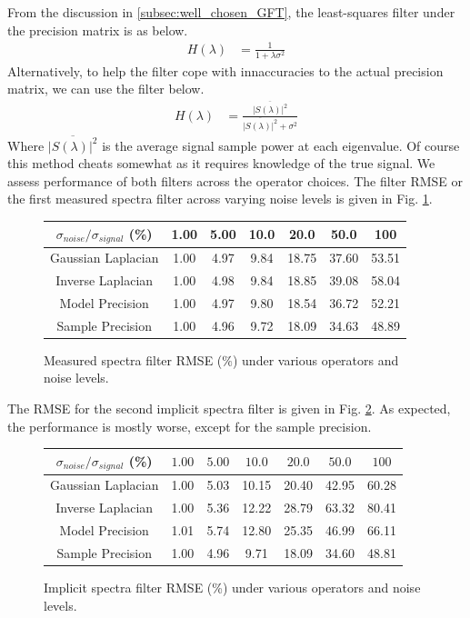 \documentclass[12pt,a4paper]{article} %
\begin{document}
From the discussion in \ref{subsec:well_chosen_GFT}, the least-squares filter under the precision matrix is as below.
\begin{align*}
    H(\lambda)&=\frac{1}{1+\lambda\sigma^2}
\end{align*}
Alternatively, to help the filter cope with innaccuracies to the actual precision matrix, we can use the filter below.
\begin{align*}
    H(\lambda)&=\frac{\overline{|S(\lambda)|^2}}{\overline{|S(\lambda)|^2}+\sigma^2}
\end{align*}
Where $\overline{|S(\lambda)|^2}$ is the average signal sample power at each eigenvalue. Of course this method cheats somewhat as it requires knowledge of the true signal. We assess performance of both filters across the operator choices. The filter RMSE or the first measured spectra filter across varying noise levels is given in Fig. \ref{fig:measured_filter}.
\begin{figure}[!ht]
    \centering
    \begin{tabular}{|c|c|c|c|c|c|c|}
        \hline
        $\sigma_{noise}/\sigma_{signal}$ (\%) & 1.00 & 5.00 & 10.0 & 20.0 & 50.0 & 100 \\
        \hline
        \hline
        Gaussian Laplacian & 1.00 & 4.97 & 9.84 & 18.75 & 37.60 & 53.51 \\
        \hline
        Inverse Laplacian & 1.00 & 4.98 & 9.84 & 18.85 & 39.08 & 58.04 \\
        \hline
        Model Precision & 1.00 & 4.97 & 9.80 & 18.54 & 36.72 & 52.21 \\
        \hline
        Sample Precision & 1.00 & 4.96 & 9.72 & 18.09 & 34.63 & 48.89 \\
        \hline
    \end{tabular}
    \caption{Measured spectra filter RMSE ($\%$) under various operators and noise levels.}
    \label{fig:measured_filter}
\end{figure}
The RMSE for the second implicit spectra filter is given in Fig. \ref{fig:implicit_filter}. As expected, the performance is mostly worse, except for the sample precision.
\begin{figure}[!ht]
    \centering
    \begin{tabular}{|c|c|c|c|c|c|c|}
        \hline
        $\sigma_{noise}/\sigma_{signal}$ (\%) & $1.00$ & $5.00$ & $10.0$ & $20.0$ & $50.0$ & $100$ \\
        \hline
        \hline
        Gaussian Laplacian & 1.00 & 5.03 & 10.15 & 20.40 & 42.95 & 60.28 \\
        \hline
        Inverse Laplacian & 1.00 & 5.36 & 12.22 & 28.79 & 63.32 & 80.41 \\
        \hline
        Model Precision & 1.01 & 5.74 & 12.80 & 25.35 & 46.99 & 66.11 \\
        \hline
        Sample Precision & 1.00 & 4.96 & 9.71 & 18.09 & 34.60 & 48.81 \\
        \hline
    \end{tabular}
    \caption{Implicit spectra filter RMSE (\%) under various operators and noise levels.}
    \label{fig:implicit_filter}
\end{figure}
\end{document}
